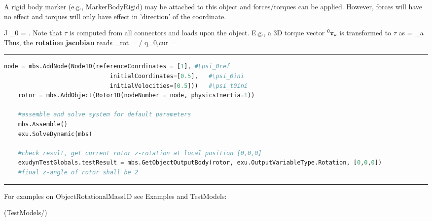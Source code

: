     \finishTable
    A rigid body marker (e.g., MarkerBodyRigid) may be attached to this object and forces/torques can be applied. 
    However, forces will have no effect and torques will only have effect in 'direction' of the coordinate.

    \be 
      J \cdot \ddot \psi_0 = \tau.
    \ee
    Note that $\tau$ is computed from all connectors and loads upon the object. E.g., a 3D torque vector $\prescript{0}{}{\mbox{\boldmath $\tau$ \unboldmath}\!\!}\,_a$ is 
    transformed to $\tau$ as
    \be
      \tau =  _a
    \ee
    Thus, the {\bf rotation jacobian} reads 
    \be
      \Jm_{rot} = \partial \tomega\cCur / \partial \dot q_{0,cur} = 
        
    \ee
\vspace{6pt}\par\noindent\rule{\textwidth}{0.4pt}
\label{miniExample_ObjectRotationalMass1D}
\pythonstyle
\begin{lstlisting}[language=Python, firstnumber=1]
    node = mbs.AddNode(Node1D(referenceCoordinates = [1], #\psi_0ref
                              initialCoordinates=[0.5],   #\psi_0ini
                              initialVelocities=[0.5]))   #\psi_t0ini
    rotor = mbs.AddObject(Rotor1D(nodeNumber = node, physicsInertia=1))

    #assemble and solve system for default parameters
    mbs.Assemble()
    exu.SolveDynamic(mbs)

    #check result, get current rotor z-rotation at local position [0,0,0]
    exudynTestGlobals.testResult = mbs.GetObjectOutputBody(rotor, exu.OutputVariableType.Rotation, [0,0,0])
    #final z-angle of rotor shall be 2

\end{lstlisting}

\vspace{6pt}\par\noindent\rule{\textwidth}{0.4pt}
%
\noindent For examples on ObjectRotationalMass1D see Examples and TestModels:
\bi
\item {} (TestModels/)
\ei

